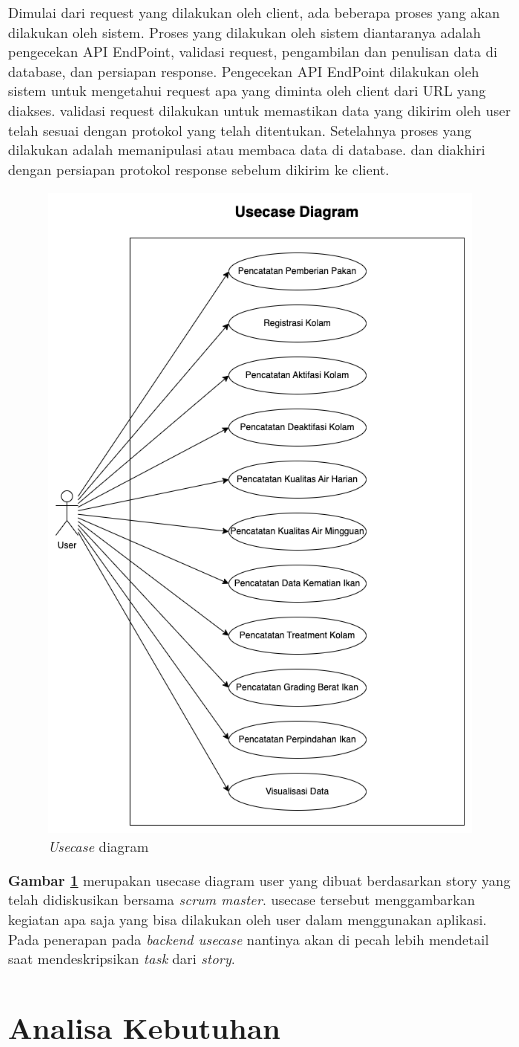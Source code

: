 Dimulai dari request yang dilakukan oleh client, ada beberapa proses yang akan dilakukan oleh sistem. Proses yang dilakukan oleh sistem diantaranya adalah pengecekan API EndPoint, validasi request, pengambilan dan penulisan data di database, dan persiapan response. Pengecekan API EndPoint dilakukan oleh sistem untuk mengetahui request apa yang diminta oleh client dari URL yang diakses. validasi request dilakukan untuk memastikan data yang dikirim oleh user telah sesuai dengan protokol yang telah ditentukan. Setelahnya proses yang dilakukan adalah memanipulasi atau membaca data di database. dan diakhiri dengan persiapan protokol response sebelum dikirim ke client.

\begin{figure}[H]
	\centering
	\includegraphics[height=0.9\textwidth]{gambar/usecase_diagram.png}
	\caption{\emph{Usecase} diagram}
	\label{fig:usecase_diagram}
\end{figure}

\textbf{Gambar \ref{fig:usecase_diagram}} merupakan usecase diagram user yang dibuat berdasarkan story yang telah didiskusikan bersama \textit{scrum master}. usecase tersebut menggambarkan kegiatan apa saja yang bisa dilakukan oleh user dalam menggunakan aplikasi. Pada penerapan pada \textit{backend usecase} nantinya akan di pecah lebih mendetail saat mendeskripsikan \textit{task} dari \textit{story}.

\section{Analisa Kebutuhan}

